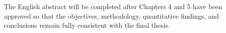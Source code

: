 \begin{TKTAbstractEN}
The English abstract will be completed after Chapters 4 and 5 have been approved so that the objectives, methodology, quantitative findings, and conclusions remain fully consistent with the final thesis.
\end{TKTAbstractEN}
